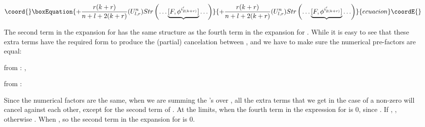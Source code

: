 \documentclass[a4paper,12pt]{article}
\begin{document}
\begin{center}
\coordHE{} 
\end{center}
\begin{center}
\coordHE{}
\begin{equation}\coord{}\boxEquation{
+\frac{r(k+r)}{n+l+2(k+r)}(U^n_{l,r})Str\left(\ldots \underbrace{ [F,\phi^{i_{2(k+r)}'}]}\ldots \right)
}{
+\frac{r(k+r)}{n+l+2(k+r)}(U^n_{l,r})Str\left(\ldots \underbrace{ [F,\phi^{i_{2(k+r)}'}]}\ldots \right)
}{ecuacion}\coordE{}\end{equation}
\end{center}
 The second term in the expansion for \coordHE{} has the same structure as the fourth term in the expansion for \coordHE{}.
While it is easy to see that these extra terms have the required form to produce the (partial) cancelation between \coordHE{}, and  \coordHE{} we have to make sure the numerical pre-factors are equal:
\begin{center}
from \coordHE{}: \coordHE{}, \newline

from \coordHE{}: \coordHE{}
\end{center}
 Since the numerical factors are the same, when we are summing the \coordHE{}'s over \coordHE{},  all the extra terms that we get in the case of a non-zero \coordHE{}  will cancel against each other, except for the second term of \coordHE{}.   At the limits, when \coordHE{} the fourth term in the expression for \coordHE{} is 0, since \coordHE{}. If \coordHE{}, \coordHE{}, otherwise \coordHE{}. When \coordHE{}, \coordHE{} so the second term in the expansion for \coordHE{} is 0. 
\end{document}
